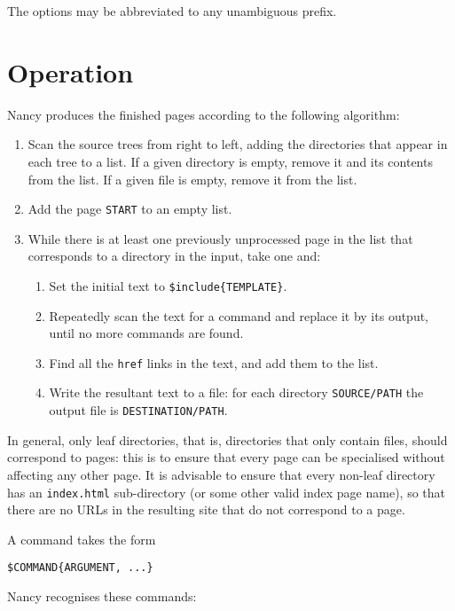 \documentclass[english]{scrartcl}
\begin{document}
The options may be abbreviated to any unambiguous prefix.

\section{Operation}
\label{operation}

Nancy produces the finished pages according to the following algorithm:

\begin{enumerate}
\item Scan the source trees from right to left, adding the directories that appear in each tree to a list. If a given directory is empty, remove it and its contents from the list. If a given file is empty, remove it from the list.
\item Add the page \verb|START| to an empty list.
\item While there is at least one previously unprocessed page in the list that corresponds to a directory in the input, take one and:
\begin{enumerate}
\item Set the initial text to \verb|$include{TEMPLATE}|.
\item Repeatedly scan the text for a command and replace it by its output, until no more commands are found.
\item Find all the \verb|href| links in the text, and add them to the list.
\item Write the resultant text to a file: for each directory \verb|SOURCE/PATH| the output file is \verb|DESTINATION/PATH|.
\end{enumerate}
\end{enumerate}

In general, only leaf directories, that is, directories that only contain files, should correspond to pages: this is to ensure that every page can be specialised without affecting any other page. It is advisable to ensure that every non-leaf directory has an \verb|index.html| sub-directory (or some other valid index page name), so that there are no URLs in the resulting site that do not correspond to a page.

A command takes the form

\begin{verbatim}
$COMMAND{ARGUMENT, ...}
\end{verbatim}

Nancy recognises these commands:
\end{document}
